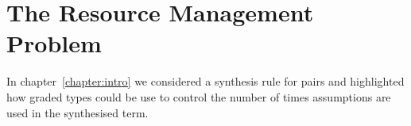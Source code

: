 \section{The Resource Management Problem}
\label{sec:resource-management}

In chapter~\ref{chapter:intro} we considered a synthesis rule for pairs and
highlighted how graded types could be use to control the number of times
assumptions are used in the synthesised term. 


